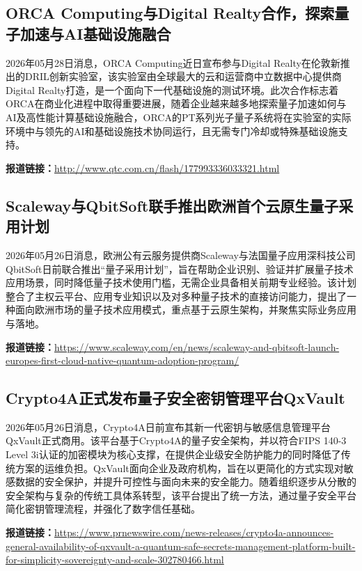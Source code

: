 \documentclass[12pt,a4paper]{ctexart}
\begin{document}
\subsection{ ORCA Computing与Digital Realty合作，探索量子加速与AI基础设施融合 }

2026年05月28日消息，ORCA Computing近日宣布参与Digital Realty在伦敦新推出的DRIL创新实验室，该实验室由全球最大的云和运营商中立数据中心提供商Digital Realty打造，是一个面向下一代基础设施的测试环境。此次合作标志着ORCA在商业化进程中取得重要进展，随着企业越来越多地探索量子加速如何与AI及高性能计算基础设施融合，ORCA的PT系列光子量子系统将在实验室的实际环境中与领先的AI和基础设施技术协同运行，且无需专门冷却或特殊基础设施支持。

\noindent\textbf{报道链接：}\url{http://www.qtc.com.cn/flash/177993336033321.html }

\subsection{ Scaleway与QbitSoft联手推出欧洲首个云原生量子采用计划 }

2026年05月26日消息，欧洲公有云服务提供商Scaleway与法国量子应用深科技公司QbitSoft日前联合推出“量子采用计划”，旨在帮助企业识别、验证并扩展量子技术应用场景，同时降低量子技术使用门槛，无需企业具备相关前期专业经验。该计划整合了主权云平台、应用专业知识以及对多种量子技术的直接访问能力，提出了一种面向欧洲市场的量子技术应用模式，重点基于云原生架构，并聚焦实际业务应用与落地。

\noindent\textbf{报道链接：}\url{https://www.scaleway.com/en/news/scaleway-and-qbitsoft-launch-europes-first-cloud-native-quantum-adoption-program/ }

\subsection{ Crypto4A正式发布量子安全密钥管理平台QxVault }

2026年05月26日消息，Crypto4A日前宣布其新一代密钥与敏感信息管理平台QxVault正式商用。该平台基于Crypto4A的量子安全架构，并以符合FIPS 140-3 Level 3i认证的加密模块为核心支撑，在提供企业级安全防护能力的同时降低了传统方案的运维负担。QxVault面向企业及政府机构，旨在以更简化的方式实现对敏感数据的安全保护，并提升可控性与面向未来的安全能力。随着组织逐步从分散的安全架构与复杂的传统工具体系转型，该平台提出了统一方法，通过量子安全平台简化密钥管理流程，并强化了数字信任基础。

\noindent\textbf{报道链接：}\url{https://www.prnewswire.com/news-releases/crypto4a-announces-general-availability-of-qxvault-a-quantum-safe-secrets-management-platform-built-for-simplicity-sovereignty-and-scale-302780466.html }
\end{document}
